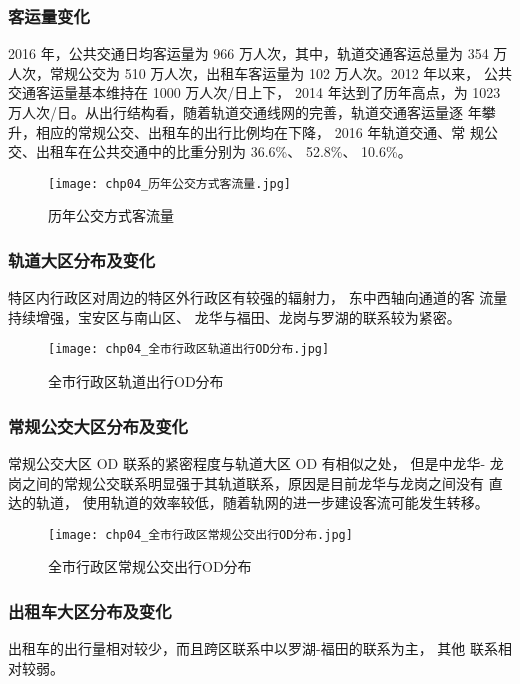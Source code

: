 \subsubsection{客运量变化}
2016 年，公共交通日均客运量为 966 万人次，其中，轨道交通客运总量为
354 万人次，常规公交为 510 万人次，出租车客运量为 102 万人次。2012 年以来，
公共交通客运量基本维持在 1000 万人次/日上下， 2014 年达到了历年高点，为
1023 万人次/日。从出行结构看，随着轨道交通线网的完善，轨道交通客运量逐
年攀升，相应的常规公交、出租车的出行比例均在下降， 2016 年轨道交通、常
规公交、出租车在公共交通中的比重分别为 36.6\%、 52.8\%、 10.6\%。

\begin{figure}[!ht]
  \centering
  \texttt{[image: chp04\_历年公交方式客流量.jpg]}
  \caption{历年公交方式客流量\label{fig:chp04_历年公交方式客流量} }
\end{figure}

\subsubsection{轨道大区分布及变化}
特区内行政区对周边的特区外行政区有较强的辐射力， 东中西轴向通道的客
流量持续增强，宝安区与南山区、 龙华与福田、龙岗与罗湖的联系较为紧密。

\begin{figure}[!ht]
  \centering
  \texttt{[image: chp04\_全市行政区轨道出行OD分布.jpg]}
  \caption{全市行政区轨道出行OD分布\label{fig:chp04_全市行政区轨道出行OD分布} }
\end{figure}

\subsubsection{常规公交大区分布及变化}
常规公交大区 OD 联系的紧密程度与轨道大区 OD 有相似之处， 但是中龙华-
龙岗之间的常规公交联系明显强于其轨道联系，原因是目前龙华与龙岗之间没有
直达的轨道， 使用轨道的效率较低，随着轨网的进一步建设客流可能发生转移。

\begin{figure}[!ht]
  \centering
  \texttt{[image: chp04\_全市行政区常规公交出行OD分布.jpg]}
  \caption{全市行政区常规公交出行OD分布\label{fig:chp04_全市行政区常规公交出行OD分布} }
\end{figure}

\subsubsection{出租车大区分布及变化}
出租车的出行量相对较少，而且跨区联系中以罗湖-福田的联系为主， 其他
联系相对较弱。

